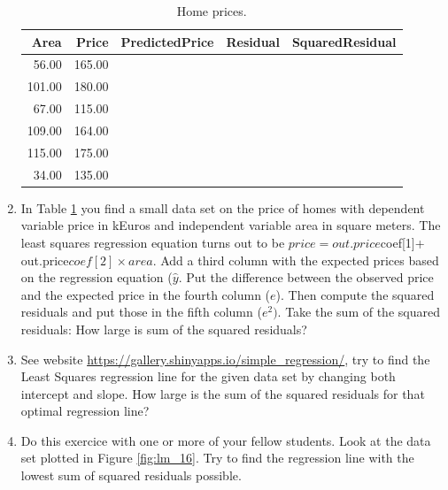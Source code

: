 \documentclass[]{report}\usepackage[]{graphicx}\usepackage[]{color}
\newenvironment{knitrout}{}{} %
\begin{document}
\begin{enumerate}



\begin{table}[ht]
\centering
\caption{Home prices.} 
\label{tab:lm_15}
\begin{tabular}{rrlll}
  \hline
Area & Price & PredictedPrice & Residual & SquaredResidual \\ 
  \hline
56.00 & 165.00 &   &   &   \\ 
  101.00 & 180.00 &   &   &   \\ 
  67.00 & 115.00 &   &   &   \\ 
  109.00 & 164.00 &   &   &   \\ 
  115.00 & 175.00 &   &   &   \\ 
  34.00 & 135.00 &   &   &   \\ 
   \hline
\end{tabular}
\end{table}


\item In Table \ref{tab:lm_15} you find a small data set on the price of homes with dependent variable price in kEuros and independent variable area in square meters. The least squares regression equation turns out to be $price = out.price$coef[1]+ out.price$coef[2]\times area$. Add a third column with the expected prices based on the regression equation ($\hat{y}$. Put the difference between the observed price and the expected price in the fourth column ($e$). Then compute the squared residuals and put those in the fifth column ($e^2)$. Take the sum of the squared residuals: How large is sum of the squared residuals?


\item See website \url{https://gallery.shinyapps.io/simple_regression/}, try to find the Least Squares regression line for the given data set by changing both intercept and slope. How large is the sum of the squared residuals for that optimal regression line?


\item Do this exercice with one or more of your fellow students. Look at the data set plotted in Figure \ref{fig:lm_16}. Try to find the regression line with the lowest sum of squared residuals possible.

\begin{knitrout}
\color{fgcolor}\begin{figure}


\end{figure}
\end{knitrout}
\end{enumerate}
\end{document}
